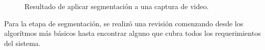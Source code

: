 \begin{figure}[H]
        \centering
        \hspace{2 mm}
  \caption{Resultado de aplicar segmentación a una captura de video.}
      \label{ejemploabelEstart}
\end{figure}

Para la etapa de segmentación, se realizó una revisión comenzando desde los algorítmos más básicos hasta encontrar alguno que cubra todos los requerimientos del sistema.

